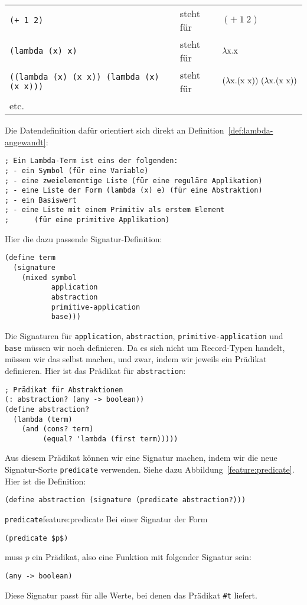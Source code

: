 \noindent\begin{tabular}{lll}
  \texttt{(+ 1 2)} & steht für & $(+~1~2)$\\
  \texttt{(lambda (x) x)} & steht für & $\lambda \mathrm x.\mathrm x$\\
  \texttt{((lambda (x) (x x)) (lambda (x) (x x)))} & steht für &
  $(\lambda \mathrm x.(\mathrm x~\mathrm x))~(\lambda \mathrm x.(\mathrm x~\mathrm x))$\\
  etc.
\end{tabular}

Die Datendefinition dafür orientiert sich direkt an
Definition~\ref{def:lambda-angewandt}:
%
\begin{lstlisting}
; Ein Lambda-Term ist eins der folgenden:
; - ein Symbol (für eine Variable)
; - eine zweielementige Liste (für eine reguläre Applikation)
; - eine Liste der Form (lambda (x) e) (für eine Abstraktion)
; - ein Basiswert
; - eine Liste mit einem Primitiv als erstem Element
;      (für eine primitive Applikation)
\end{lstlisting}
%
Hier die dazu passende Signatur-Definition:
%
\begin{lstlisting}
(define term
  (signature
    (mixed symbol
           application
           abstraction
           primitive-application
           base)))
\end{lstlisting}
%
Die Signaturen für \lstinline{application}, \lstinline{abstraction},
\lstinline{primitive-application} und \lstinline{base} müssen wir noch
definieren.  Da es sich nicht um Record-Typen handelt, müssen wir das
selbst machen, und zwar, indem wir jeweils ein Prädikat definieren.
Hier ist das Prädikat für \lstinline{abstraction}:
%
\begin{lstlisting}
; Prädikat für Abstraktionen
(: abstraction? (any -> boolean))
(define abstraction?
  (lambda (term)
    (and (cons? term)
         (equal? 'lambda (first term)))))
\end{lstlisting}
%
Aus diesem Prädikat können wir eine Signatur machen, indem wir die
neue Signatur-Sorte \lstinline{predicate} verwenden.  Siehe dazu
Abbildung~\ref{feature:predicate}.  Hier ist die Definition:
%
\begin{lstlisting}
(define abstraction (signature (predicate abstraction?)))
\end{lstlisting}
%
\begin{feature}{\texttt{predicate}}{feature:predicate}
  Bei einer Signatur der Form
\begin{lstlisting}
(predicate $p$)
\end{lstlisting}
  muss $p$ ein Prädikat, also eine Funktion mit folgender Signatur sein:
\begin{lstlisting}
(any -> boolean)
\end{lstlisting}
  Diese Signatur passt für alle Werte, bei denen das Prädikat
  \lstinline{#t} liefert.
\end{feature}
